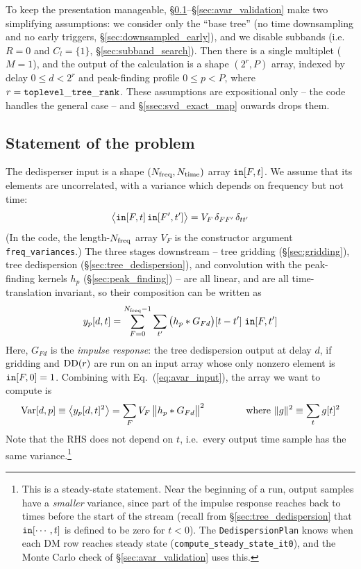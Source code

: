 \documentclass{article}
\numberwithin{equation}{section}   %
\def\DD{{\rm DD}}
\begin{document}
To keep the presentation manageable, \S\ref{sec:avar_statement}--\S\ref{sec:avar_validation}
make two simplifying assumptions: we consider
only the ``base tree'' (no time downsampling and no early triggers, \S\ref{sec:downsampled_early}),
and we disable subbands (i.e.\ $R=0$ and $C_l = \{1\}$, \S\ref{sec:subband_search}).
Then there is a single multiplet ($M=1$), and the output of the calculation is a shape $(2^r,P)$
array, indexed by delay $0 \le d < 2^r$ and peak-finding profile $0 \le p < P$, where
$r = {\tt toplevel\_tree\_rank}$. These assumptions are expositional only -- the code handles the
general case -- and \S\ref{ssec:svd_exact_map} onwards drops them.

\subsection{Statement of the problem}
\label{sec:avar_statement}

The dedisperser input is a shape $(N_{\rm freq}, N_{\rm time})$ array ${\tt in}[F,t]$.
We assume that its elements are uncorrelated, with a variance which depends on frequency but not
time:
\begin{equation}
\big\langle {\tt in}[F,t] \, {\tt in}[F',t'] \big\rangle = V_F \, \delta_{FF'} \, \delta_{tt'}
  \label{eq:avar_input}
\end{equation}
(In the code, the length-$N_{\rm freq}$ array $V_F$ is the constructor argument
\verb|freq_variances|.)
The three stages downstream -- tree gridding (\S\ref{sec:gridding}), tree dedispersion
(\S\ref{sec:tree_dedispersion}), and convolution with the peak-finding kernels $h_p$
(\S\ref{sec:peak_finding}) -- are all linear, and are all time-translation invariant, so their
composition can be written as
\begin{equation}
y_p[d,t] = \sum_{F=0}^{N_{\rm freq}-1} \sum_{t'} \big( h_p * G_{Fd} \big)[t-t'] \; {\tt in}[F,t']
\end{equation}
Here, $G_{Fd}$ is the {\em impulse response}: the tree dedispersion output at delay $d$, if
gridding and $\DD(r)$ are run on an input array whose only nonzero element is ${\tt in}[F,0]=1$.
Combining with Eq.\ (\ref{eq:avar_input}), the array we want to compute is
\begin{equation}
{\rm Var}[d,p] \equiv \big\langle y_p[d,t]^2 \big\rangle
  = \sum_F V_F \, \big\| h_p * G_{Fd} \big\|^2
  \hspace{1.5cm} \mbox{where } \|g\|^2 \equiv \sum_t g[t]^2
  \label{eq:avar_master}
\end{equation}
Note that the RHS does not depend on $t$, i.e.\ every output time sample has the same
variance.\footnote{This is a steady-state statement. Near the beginning of a run, output samples
have a {\em smaller} variance, since part of the impulse response reaches back to times before the
start of the stream (recall from \S\ref{sec:tree_dedispersion} that ${\tt in}[\cdots,t]$ is
defined to be zero for $t<0$). The {\tt DedispersionPlan} knows when each DM row reaches steady
state ({\tt compute\_steady\_state\_it0}), and the Monte Carlo check of \S\ref{sec:avar_validation}
uses this.}
\end{document}
